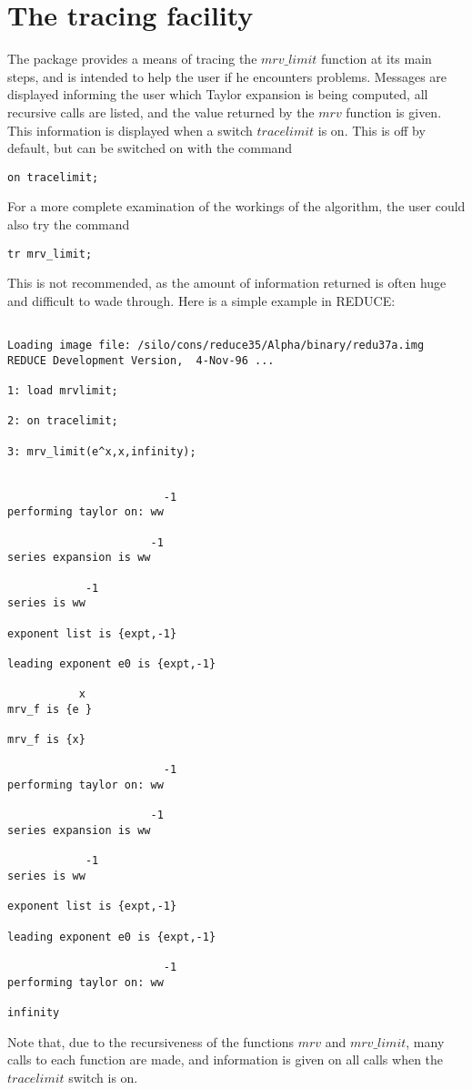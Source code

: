 \section{The tracing facility}
The package provides a means of tracing the $mrv\_limit$ function at its main steps, and is intended to help the user if he encounters problems. Messages are displayed informing the user which Taylor expansion is being computed, all recursive calls are listed, and the value returned by the $mrv$ function is given. This information is displayed when  a switch $tracelimit$ is on. This is off by default, but can be switched on with the command
\begin{verbatim}
on tracelimit;
\end{verbatim}
For a more complete examination of the workings of the algorithm, the user could also try the command
\begin{verbatim}
tr mrv_limit;
\end{verbatim}
This is not recommended, as the amount of information returned is often huge and difficult to wade through.
Here is a simple example in \small{REDUCE}:
\begin{verbatim}

Loading image file: /silo/cons/reduce35/Alpha/binary/redu37a.img
REDUCE Development Version,  4-Nov-96 ...

1: load mrvlimit;

2: on tracelimit;

3: mrv_limit(e^x,x,infinity);


                        -1
performing taylor on: ww

                      -1
series expansion is ww

            -1
series is ww

exponent list is {expt,-1}

leading exponent e0 is {expt,-1}

           x
mrv_f is {e }

mrv_f is {x}

                        -1
performing taylor on: ww

                      -1
series expansion is ww

            -1
series is ww

exponent list is {expt,-1}

leading exponent e0 is {expt,-1}

                        -1
performing taylor on: ww   

infinity
\end{verbatim}
\vspace{10 mm}
Note that, due to the recursiveness of the functions $mrv$ and $mrv\_limit$, many calls to each function are made, and information is given on all calls when the $ tracelimit$ switch is on.

